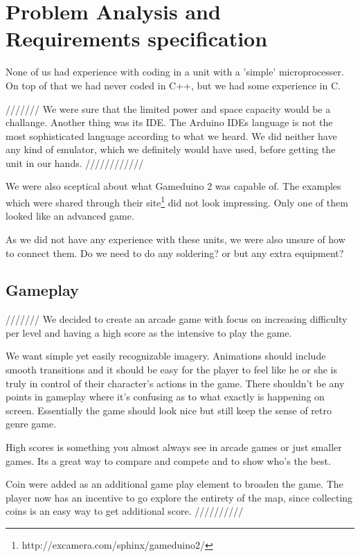 \chapter{Problem Analysis and Requirements specification}
None of us had experience with coding in a unit with a 'simple' microprocesser. On top of that we had never coded in C++, but we had some experience in C.

///////
We were sure that the limited power and space capacity would be a challange. Another thing was its IDE. The Arduino IDEs language is not the most
sophisticated language according to what we heard. We did neither have any kind of emulator, which we definitely would have used, before getting the unit in our hands.
////////////

We were also sceptical about what Gameduino 2 was capable of. The examples
which were shared through their site\footnote{http://excamera.com/sphinx/gameduino2/} did not look impressing. Only one of them
looked like an advanced game.

As we did not have any experience with these units, we were also unsure of how to connect them. Do we need to do any soldering? or but any extra equipment?

\newpage

\section{Gameplay}%
///////
We decided to create an arcade game with focus on increasing difficulty per level and having a high score as the intensive to play the game.

We want simple yet easily recognizable imagery. Animations should include smooth transitions and it should be easy for the player to feel like he or she is truly in control of their character's actions in the game. There shouldn't be any points in gameplay where it's confusing as to what exactly is happening on screen. Essentially the game should look nice but still keep the sense of retro genre game.
 
High scores is something you almost always see in arcade games or just smaller games. Its a great way to compare and compete and to show who's the best.

Coin were added as an additional game play element to broaden the game. The player now has an incentive to go explore the entirety of the map, since collecting coins is an easy way to get additional score.
//////////


